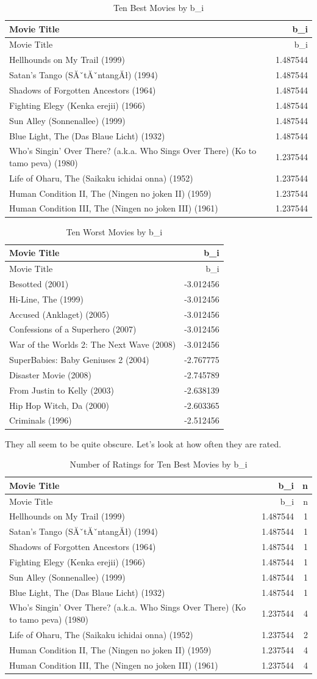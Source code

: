 \documentclass[
]{article}
\begin{document}
\begin{longtable}[]{@{}lr@{}}
\caption{Ten Best Movies by b\_i}\tabularnewline
\toprule
Movie Title & b\_i\tabularnewline
\midrule
\endfirsthead
\toprule
Movie Title & b\_i\tabularnewline
\midrule
\endhead
Hellhounds on My Trail (1999) & 1.487544\tabularnewline
Satan's Tango (SĂˇtĂˇntangĂł) (1994) & 1.487544\tabularnewline
Shadows of Forgotten Ancestors (1964) & 1.487544\tabularnewline
Fighting Elegy (Kenka erejii) (1966) & 1.487544\tabularnewline
Sun Alley (Sonnenallee) (1999) & 1.487544\tabularnewline
Blue Light, The (Das Blaue Licht) (1932) & 1.487544\tabularnewline
Who's Singin' Over There? (a.k.a. Who Sings Over There) (Ko to tamo
peva) (1980) & 1.237544\tabularnewline
Life of Oharu, The (Saikaku ichidai onna) (1952) &
1.237544\tabularnewline
Human Condition II, The (Ningen no joken II) (1959) &
1.237544\tabularnewline
Human Condition III, The (Ningen no joken III) (1961) &
1.237544\tabularnewline
\bottomrule
\end{longtable}

\begin{longtable}[]{@{}lr@{}}
\caption{Ten Worst Movies by b\_i}\tabularnewline
\toprule
Movie Title & b\_i\tabularnewline
\midrule
\endfirsthead
\toprule
Movie Title & b\_i\tabularnewline
\midrule
\endhead
Besotted (2001) & -3.012456\tabularnewline
Hi-Line, The (1999) & -3.012456\tabularnewline
Accused (Anklaget) (2005) & -3.012456\tabularnewline
Confessions of a Superhero (2007) & -3.012456\tabularnewline
War of the Worlds 2: The Next Wave (2008) & -3.012456\tabularnewline
SuperBabies: Baby Geniuses 2 (2004) & -2.767775\tabularnewline
Disaster Movie (2008) & -2.745789\tabularnewline
From Justin to Kelly (2003) & -2.638139\tabularnewline
Hip Hop Witch, Da (2000) & -2.603365\tabularnewline
Criminals (1996) & -2.512456\tabularnewline
\bottomrule
\end{longtable}

They all seem to be quite obscure. Let's look at how often they are
rated.

\begin{longtable}[]{@{}lrr@{}}
\caption{Number of Ratings for Ten Best Movies by b\_i}\tabularnewline
\toprule
Movie Title & b\_i & n\tabularnewline
\midrule
\endfirsthead
\toprule
Movie Title & b\_i & n\tabularnewline
\midrule
\endhead
Hellhounds on My Trail (1999) & 1.487544 & 1\tabularnewline
Satan's Tango (SĂˇtĂˇntangĂł) (1994) & 1.487544 & 1\tabularnewline
Shadows of Forgotten Ancestors (1964) & 1.487544 & 1\tabularnewline
Fighting Elegy (Kenka erejii) (1966) & 1.487544 & 1\tabularnewline
Sun Alley (Sonnenallee) (1999) & 1.487544 & 1\tabularnewline
Blue Light, The (Das Blaue Licht) (1932) & 1.487544 & 1\tabularnewline
Who's Singin' Over There? (a.k.a. Who Sings Over There) (Ko to tamo
peva) (1980) & 1.237544 & 4\tabularnewline
Life of Oharu, The (Saikaku ichidai onna) (1952) & 1.237544 &
2\tabularnewline
Human Condition II, The (Ningen no joken II) (1959) & 1.237544 &
4\tabularnewline
Human Condition III, The (Ningen no joken III) (1961) & 1.237544 &
4\tabularnewline
\bottomrule
\end{longtable}
\end{document}
